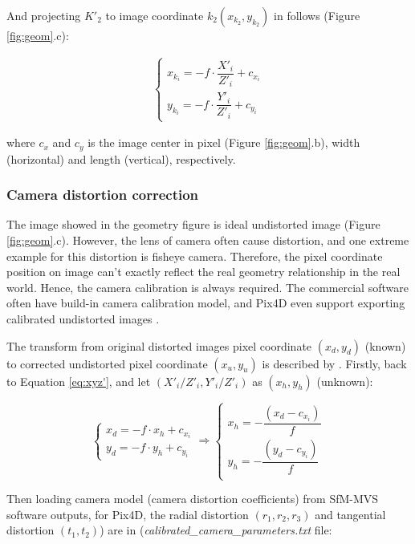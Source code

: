 \documentclass{configs/bmcart}
\begin{document}
And projecting $K'_2$ to image coordinate $k_2 (x_{k_2}, y_{k_2})$ in follows \cite{pix4d_support_how_2020} (Figure \ref{fig:geom}.c):

\begin{align}
  \label{eq:xyz'}
  \begin{cases}
    x_{k_i} = - f \cdot \dfrac{X'_i}{Z'_i} + c_{x_i} \\
    y_{k_i} = - f \cdot \dfrac{Y'_i}{Z'_i} + c_{y_i}
  \end{cases}
\end{align}

where $c_x$ and $c_y$ is the image center in pixel (Figure \ref{fig:geom}.b), width (horizontal) and length (vertical), respectively. 

\subsubsection*{Camera distortion correction}
The image showed in the geometry figure is ideal undistorted image (Figure \ref{fig:geom}.c). However, the lens of camera often cause distortion, and one extreme example for this distortion is fisheye camera. Therefore, the pixel coordinate position on image can't exactly reflect the real geometry relationship in the real world. Hence, the camera calibration is always required. The commercial software often have build-in camera calibration model, and Pix4D even support exporting calibrated undistorted images \cite{pix4d_support_menu_2020}. 

The transform from original distorted images pixel coordinate $(x_d, y_d)$ (known) to corrected undistorted pixel coordinate $(x_u, y_u)$ is described by \cite{pix4d_support_how_2020}. Firstly, back to Equation \ref{eq:xyz'}, and let $(X'_i / Z'_i, Y'_i / Z'_i)$ as $(x_h, y_h)$ (unknown):

$$
\begin{cases}
  x_d = - f \cdot x_h + c_{x_i} \\
  y_d = - f \cdot y_h + c_{y_i}
\end{cases}
\Rightarrow
\begin{cases}
  x_h  = - \dfrac{(x_d - c_{x_i})}{f} \\
  y_h  = - \dfrac{(y_d - c_{y_i})}{f} \\
\end{cases}
$$

Then loading camera model (camera distortion coefficients) from SfM-MVS software outputs, for Pix4D, the radial distortion $(r_1, r_2, r_3)$ and tangential distortion $(t_1, t_2)$) are in (\textit{calibrated\_camera\_parameters.txt} file:
\end{document}
